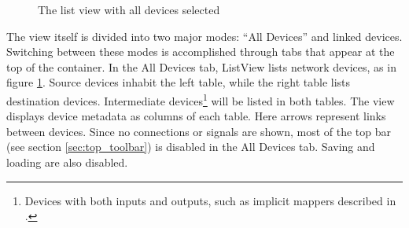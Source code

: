 \begin{figure}[ht]
\centering
\caption{The list view with all devices selected}
\label{fig:list_view_all_devices}
\end{figure}

The view itself is divided into two major modes: ``All Devices'' and linked devices. Switching between these modes is accomplished through tabs that appear at the top of the container. In the All Devices tab, ListView lists network devices, as in figure \ref{fig:list_view_all_devices}. Source devices inhabit the left table, while the right table lists destination devices. Intermediate devices\footnote{Devices with both inputs and outputs, such as implicit mappers described in .} will be listed in both tables. The view displays device metadata as columns of each table. Here arrows represent links between devices. Since no connections or signals are shown, most of the top bar (see section \ref{sec:top_toolbar}) is disabled in the All Devices tab. Saving and loading are also disabled.

